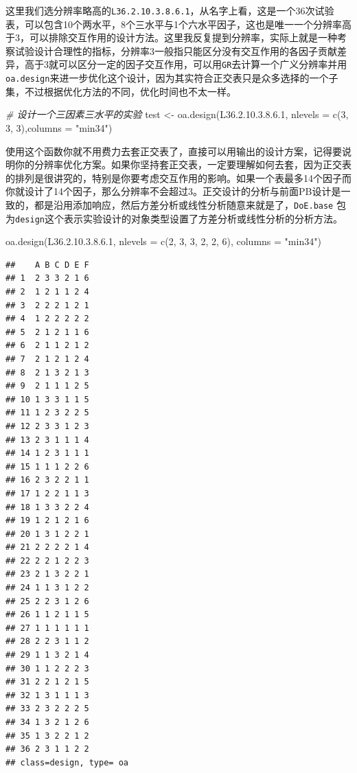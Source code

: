 \documentclass[]{tufte-book}
\newenvironment{Shaded}{}{}
\newcommand{\AttributeTok}[1]{\textcolor[rgb]{0.49,0.56,0.16}{#1}}
\newcommand{\CommentTok}[1]{\textcolor[rgb]{0.38,0.63,0.69}{\textit{#1}}}
\newcommand{\DecValTok}[1]{\textcolor[rgb]{0.25,0.63,0.44}{#1}}
\newcommand{\FloatTok}[1]{\textcolor[rgb]{0.25,0.63,0.44}{#1}}
\newcommand{\FunctionTok}[1]{\textcolor[rgb]{0.02,0.16,0.49}{#1}}
\newcommand{\NormalTok}[1]{#1}
\newcommand{\OtherTok}[1]{\textcolor[rgb]{0.00,0.44,0.13}{#1}}
\newcommand{\StringTok}[1]{\textcolor[rgb]{0.25,0.44,0.63}{#1}}
\begin{document}
这里我们选分辨率略高的\texttt{L36.2.10.3.8.6.1}，从名字上看，这是一个36次试验表，可以包含10个两水平，8个三水平与1个六水平因子，这也是唯一一个分辨率高于3，可以排除交互作用的设计方法。这里我反复提到分辨率，实际上就是一种考察试验设计合理性的指标，分辨率3一般指只能区分没有交互作用的各因子贡献差异，高于3就可以区分一定的因子交互作用，可以用\texttt{GR}去计算一个广义分辨率并用\texttt{oa.design}来进一步优化这个设计，因为其实符合正交表只是众多选择的一个子集，不过根据优化方法的不同，优化时间也不太一样。

\begin{Shaded}
\begin{Highlighting}[]
\CommentTok{\# 设计一个三因素三水平的实验}
\NormalTok{test }\OtherTok{\textless{}{-}} \FunctionTok{oa.design}\NormalTok{(L36.}\DecValTok{2}\NormalTok{.}\DecValTok{10}\NormalTok{.}\DecValTok{3}\NormalTok{.}\DecValTok{8}\NormalTok{.}\FloatTok{6.1}\NormalTok{, }\AttributeTok{nlevels =} \FunctionTok{c}\NormalTok{(}\DecValTok{3}\NormalTok{, }\DecValTok{3}\NormalTok{, }\DecValTok{3}\NormalTok{),}\AttributeTok{columns =} \StringTok{"min34"}\NormalTok{)}
\end{Highlighting}
\end{Shaded}

使用这个函数你就不用费力去套正交表了，直接可以用输出的设计方案，记得要说明你的分辨率优化方案。如果你坚持套正交表，一定要理解如何去套，因为正交表的排列是很讲究的，特别是你要考虑交互作用的影响。如果一个表最多14个因子而你就设计了14个因子，那么分辨率不会超过3。正交设计的分析与前面PB设计是一致的，都是沿用添加响应，然后方差分析或线性分析随意来就是了，\texttt{DoE.base} 包为\texttt{design}这个表示实验设计的对象类型设置了方差分析或线性分析的分析方法。

\begin{Shaded}
\begin{Highlighting}[]
\FunctionTok{oa.design}\NormalTok{(L36.}\DecValTok{2}\NormalTok{.}\DecValTok{10}\NormalTok{.}\DecValTok{3}\NormalTok{.}\DecValTok{8}\NormalTok{.}\FloatTok{6.1}\NormalTok{, }\AttributeTok{nlevels =} \FunctionTok{c}\NormalTok{(}\DecValTok{2}\NormalTok{, }\DecValTok{3}\NormalTok{, }\DecValTok{3}\NormalTok{, }\DecValTok{2}\NormalTok{, }\DecValTok{2}\NormalTok{, }\DecValTok{6}\NormalTok{), }\AttributeTok{columns =} \StringTok{"min34"}\NormalTok{)}
\end{Highlighting}
\end{Shaded}

\begin{verbatim}
##    A B C D E F
## 1  2 3 3 2 1 6
## 2  1 2 1 1 2 4
## 3  2 2 2 1 2 1
## 4  1 2 2 2 2 2
## 5  2 1 2 1 1 6
## 6  2 1 1 2 1 2
## 7  2 1 2 1 2 4
## 8  2 1 3 2 1 3
## 9  2 1 1 1 2 5
## 10 1 3 3 1 1 5
## 11 1 2 3 2 2 5
## 12 2 3 3 1 2 3
## 13 2 3 1 1 1 4
## 14 1 2 3 1 1 1
## 15 1 1 1 2 2 6
## 16 2 3 2 2 1 1
## 17 1 2 2 1 1 3
## 18 1 3 3 2 2 4
## 19 1 2 1 2 1 6
## 20 1 3 1 2 2 1
## 21 2 2 2 2 1 4
## 22 2 2 1 2 2 3
## 23 2 1 3 2 2 1
## 24 1 1 3 1 2 2
## 25 2 2 3 1 2 6
## 26 1 1 2 1 1 5
## 27 1 1 1 1 1 1
## 28 2 2 3 1 1 2
## 29 1 1 3 2 1 4
## 30 1 1 2 2 2 3
## 31 2 2 1 2 1 5
## 32 1 3 1 1 1 3
## 33 2 3 2 2 2 5
## 34 1 3 2 1 2 6
## 35 1 3 2 2 1 2
## 36 2 3 1 1 2 2
## class=design, type= oa
\end{verbatim}
\end{document}
